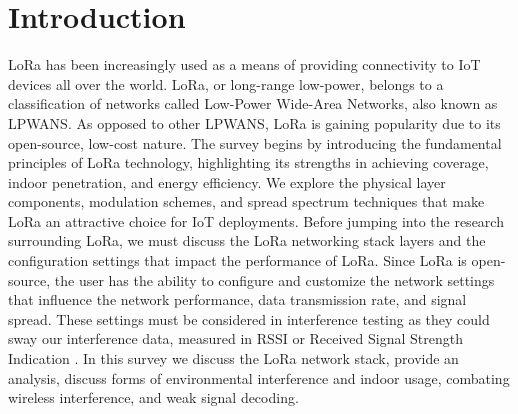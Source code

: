 \documentclass[sigsmall]{acmart}
\begin{document}
\section*{Introduction}
LoRa has been increasingly used as a means of providing connectivity to IoT devices all over the world. LoRa, or long-range low-power, belongs to a classification of networks called Low-Power Wide-Area Networks, also known as LPWANS. As opposed to other LPWANS, LoRa is gaining popularity due to its open-source, low-cost nature. The survey begins by introducing the fundamental principles of LoRa technology, highlighting its strengths in achieving coverage, indoor penetration, and energy efficiency. We explore the physical layer components, modulation schemes, and spread spectrum techniques that make LoRa an attractive choice for IoT deployments. Before jumping into the research surrounding LoRa, we must discuss the LoRa networking stack layers and the configuration settings that impact the performance of LoRa. Since LoRa is open-source, the user has the ability to configure and customize the network settings that influence the network performance, data transmission rate, and signal spread. These settings must be considered in interference testing as they could sway our interference data, measured in RSSI or Received Signal Strength Indication \cite{loraLoRax2014}. In this survey we discuss the LoRa network stack, provide an analysis, discuss forms of environmental interference and indoor usage, combating wireless interference, and weak signal decoding.
\end{document}
